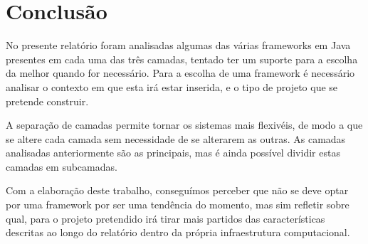 \section{Conclusão}

No presente relatório foram analisadas algumas das várias frameworks em Java presentes em cada uma das três camadas, tentado ter um suporte para a escolha da melhor quando for necessário. Para a escolha de uma framework é necessário analisar o contexto em que esta irá estar inserida, e o tipo de projeto que se pretende construir.

A separação de camadas permite tornar os sistemas mais flexivéis, de modo a que se altere cada camada sem necessidade de se alterarem as outras. As camadas analisadas anteriormente são as principais, mas é ainda possível dividir estas camadas em subcamadas.

Com a elaboração deste trabalho, conseguímos perceber que não se deve optar por uma framework por ser uma tendência do momento, mas sim refletir sobre qual, para o projeto pretendido irá tirar mais partidos das características descritas ao longo do relatório dentro da própria infraestrutura computacional.
